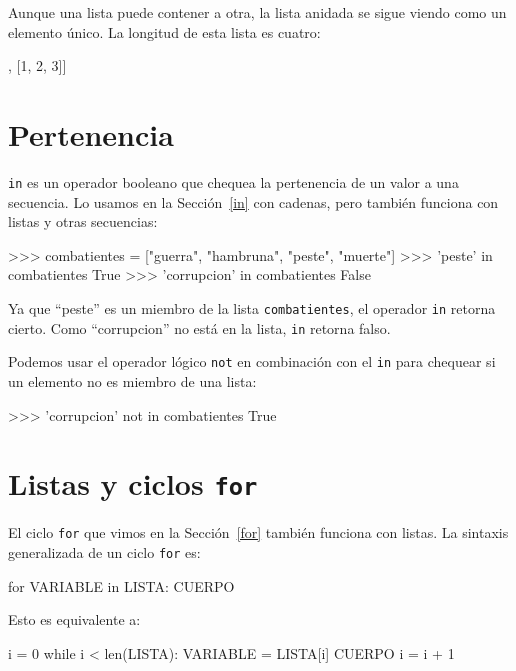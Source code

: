 Aunque una lista puede contener a otra, la lista anidada se sigue
viendo como un elemento único. La longitud de esta lista es cuatro:
\begin{pythoncode}
['basura!', 1, ['Brie', 'Roquefort', 'Pol le Veq'], 
 [1, 2, 3]]
\end{pythoncode}

\section{Pertenencia}

  

\texttt{in} es un operador booleano que chequea la pertenencia de
un valor a una secuencia. Lo usamos en la Sección~\ref{in} con cadenas,
pero también funciona con listas y otras secuencias:
\begin{pyconcode}
>>> combatientes = ["guerra", "hambruna", "peste", "muerte"]
>>> 'peste' in combatientes
True
>>> 'corrupcion' in combatientes
False
\end{pyconcode}

Ya que ``peste'' es un miembro de la lista \texttt{combatientes},
el operador \texttt{in} retorna cierto. Como ``corrupcion'' no está
en la lista, \texttt{in} retorna falso.

Podemos usar el operador lógico \texttt{not} en combinación con el
\texttt{in} para chequear si un elemento no es miembro de una lista:
\begin{pyconcode}
>>> 'corrupcion' not in combatientes
True
\end{pyconcode}

\section{Listas y ciclos \texttt{for}}

  

El ciclo \texttt{for} que vimos en la Sección~\ref{for} también
funciona con listas. La sintaxis generalizada de un ciclo \texttt{for}
es:
\begin{pythoncode}
for VARIABLE in LISTA:
  CUERPO
\end{pythoncode}

Esto es equivalente a:
\begin{pythoncode}
i = 0
while i < len(LISTA):
  VARIABLE = LISTA[i]
  CUERPO
  i = i + 1
\end{pythoncode}

